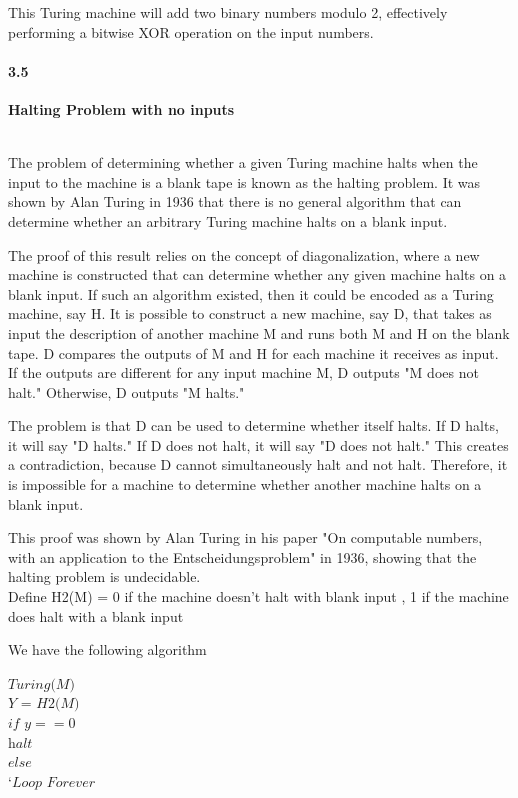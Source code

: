 This Turing machine will add two binary numbers modulo 2, effectively performing a bitwise XOR operation on the input numbers.



\paragraph{3.5} \textbf{Halting Problem with no inputs}

\\

The problem of determining whether a given Turing machine halts when the input to the machine is a blank tape is known as the halting problem. It was shown by Alan Turing in 1936 that there is no general algorithm that can determine whether an arbitrary Turing machine halts on a blank input.

The proof of this result relies on the concept of diagonalization, where a new machine is constructed that can determine whether any given machine halts on a blank input. If such an algorithm existed, then it could be encoded as a Turing machine, say H. It is possible to construct a new machine, say D, that takes as input the description of another machine M and runs both M and H on the blank tape. D compares the outputs of M and H for each machine it receives as input. If the outputs are different for any input machine M, D outputs "M does not halt." Otherwise, D outputs "M halts."

The problem is that D can be used to determine whether itself halts. If D halts, it will say "D halts." If D does not halt, it will say "D does not halt." This creates a contradiction, because D cannot simultaneously halt and not halt. Therefore, it is impossible for a machine to determine whether another machine halts on a blank input.

This proof was shown by Alan Turing in his paper "On computable numbers, with an application to the Entscheidungsproblem" in 1936, showing that the halting problem is undecidable.
\\

Define H2(M) = {0  if the machine doesn't halt with blank input 
, 1  if the machine does halt with a blank input}

We have the following algorithm

$\textit{Turing(M)}$\\
$\textit{Y = H2(M)}$ \\
$\textit{if } y== 0$ \\ 
    $ \textit{halt}$\\
$\textit{else}$\\
`$\textit{Loop Forever}$\\

